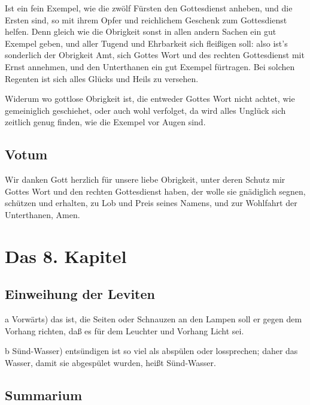 Ist ein fein Exempel, wie die zwölf Fürsten den Gottesdienst anheben, und die Ersten sind, so mit ihrem Opfer und reichlichem Geschenk zum Gottesdienst helfen. Denn gleich wie die Obrigkeit sonst in allen andern Sachen ein gut Exempel geben, und aller Tugend und Ehrbarkeit sich fleißigen soll: also ist's sonderlich der Obrigkeit Amt, sich Gottes Wort und des rechten Gottesdienst mit Ernst annehmen, und den Unterthanen ein gut Exempel fürtragen. Bei solchen Regenten ist sich alles Glücks und Heils zu versehen.

Widerum wo gottlose Obrigkeit ist, die entweder Gottes Wort nicht achtet, wie gemeiniglich geschiehet, oder auch wohl verfolget, da wird alles Unglück sich zeitlich genug finden, wie die Exempel vor Augen sind.

\section{Votum}

Wir danken Gott herzlich für unsere liebe Obrigkeit, unter deren Schutz mir Gottes Wort und den rechten Gottesdienst haben, der wolle sie gnädiglich segnen, schützen und erhalten, zu Lob und Preis seines Namens, und zur Wohlfahrt der Unterthanen, Amen.

\chapter{Das 8. Kapitel}

\section{Einweihung der Leviten}

a Vorwärts) das ist, die Seiten oder Schnauzen an den Lampen soll er gegen dem Vorhang richten, daß es für dem Leuchter und Vorhang Licht sei.

b Sünd-Wasser) entsündigen ist so viel als abspülen oder lossprechen; daher das Wasser, damit sie abgespület wurden, heißt Sünd-Wasser.

\section{Summarium}

